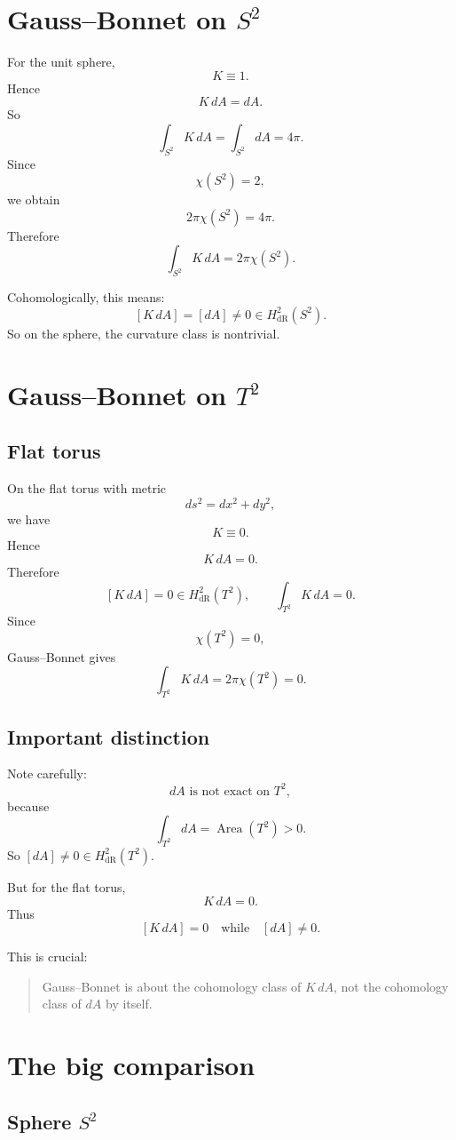 \documentclass[11pt]{article}
\begin{document}
	\section{Gauss--Bonnet on \(S^2\)}
	
	For the unit sphere,
	\[
	K\equiv 1.
	\]
	Hence
	\[
	K\,dA=dA.
	\]
	So
	\[
	\int_{S^2}K\,dA
	=
	\int_{S^2}dA
	=
	4\pi.
	\]
	Since
	\[
	\chi(S^2)=2,
	\]
	we obtain
	\[
	2\pi\chi(S^2)=4\pi.
	\]
	Therefore
	\[
	\int_{S^2}K\,dA = 2\pi\chi(S^2).
	\]
	
	Cohomologically, this means:
	\[
	[K\,dA]=[dA]\neq 0\in H^2_{\mathrm{dR}}(S^2).
	\]
	So on the sphere, the curvature class is nontrivial.
	
	\section{Gauss--Bonnet on \(T^2\)}
	
	\subsection*{Flat torus}
	
	On the flat torus with metric
	\[
	ds^2=dx^2+dy^2,
	\]
	we have
	\[
	K\equiv 0.
	\]
	Hence
	\[
	K\,dA=0.
	\]
	Therefore
	\[
	[K\,dA]=0\in H^2_{\mathrm{dR}}(T^2),
	\qquad
	\int_{T^2}K\,dA=0.
	\]
	Since
	\[
	\chi(T^2)=0,
	\]
	Gauss--Bonnet gives
	\[
	\int_{T^2}K\,dA=2\pi\chi(T^2)=0.
	\]
	
	\subsection*{Important distinction}
	
	Note carefully:
	\[
	dA \text{ is not exact on }T^2,
	\]
	because
	\[
	\int_{T^2}dA=\operatorname{Area}(T^2)>0.
	\]
	So \([dA]\neq 0\in H^2_{\mathrm{dR}}(T^2)\).
	
	But for the flat torus,
	\[
	K\,dA=0.
	\]
	Thus
	\[
	[K\,dA]=0 \quad\text{while}\quad [dA]\neq 0.
	\]
	
	This is crucial:
	\begin{quote}
		Gauss--Bonnet is about the cohomology class of \(K\,dA\), not the cohomology class of \(dA\) by itself.
	\end{quote}
	
	\section{The big comparison}
	
	\subsection*{Sphere \(S^2\)}
	
\end{document}
